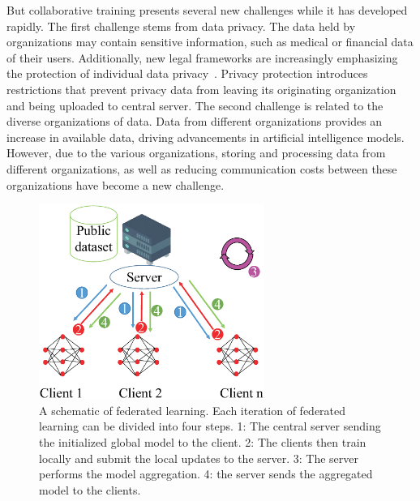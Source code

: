 \documentclass[a4paper,fleqn]{cas-dc}
\begin{document}
But collaborative training presents several new challenges while it has developed rapidly.
The first challenge stems from data privacy. The data held
by organizations may contain sensitive information, such
as medical or financial data of their users. Additionally,
new legal frameworks are increasingly emphasizing the
protection of individual data privacy~\cite{voigt2017eu}. Privacy protection introduces restrictions that prevent privacy data from
leaving its originating organization and being uploaded
to central server. The second challenge is related to the
diverse organizations of data. Data from different organizations provides an increase in available data, driving
advancements in artificial intelligence models. However,
due to the various organizations, storing and processing
data from different organizations, as well as reducing communication costs between these organizations have
become a new challenge.

\begin{figure}[t]
	\centering

	\includegraphics[width=1.0\linewidth,height=2.5in]{output/fig1.eps}
	\caption{A schematic of federated learning.
		Each iteration of federated learning can be divided into four steps.
		1: The central server sending the initialized global model to the client. 2: The
		clients then train locally and submit the local updates to the server. 3: The server performs the model aggregation.
		4: the server sends the aggregated model to the clients.}
	\label{fig1}
\end{figure}
\end{document}
